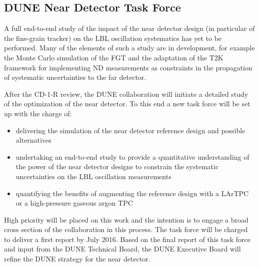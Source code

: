 \subsection{DUNE Near Detector Task Force}

A full end-to-end study of the impact of the near detector design (in particular of the fine-grain tracker) on the LBL oscillation 
systematics has yet to be performed. Many of the elements of such a study are in 
development, for example the Monte Carlo simulation of the FGT and the adaptation 
of the T2K framework for implementing ND measurements as constraints in the propagation 
of systematic uncertainties to the far detector. 

After the CD-1-R review, the DUNE collaboration will initiate a detailed study 
of the optimization of the near detector. To this end a new task force will be set 
up with the charge of:

\begin{itemize}
\item delivering the simulation of the near detector reference design and possible alternatives

\item undertaking an end-to-end study to provide a quantitative understanding of 
the power of the near detector designs to constrain the systematic uncertainties on the LBL 
oscillation measurements

\item quantifying the benefits of augmenting the reference design with a LArTPC 
or a high-pressure gaseous argon TPC
\end{itemize}

High priority will be placed on this work and the intention is to engage a broad 
cross section of the collaboration in this process. The task force will be charged 
to deliver a first report by July 2016. Based on the final report of this task force and input 
from the DUNE Technical Board, the DUNE Executive Board will refine the DUNE strategy 
for the near detector.


